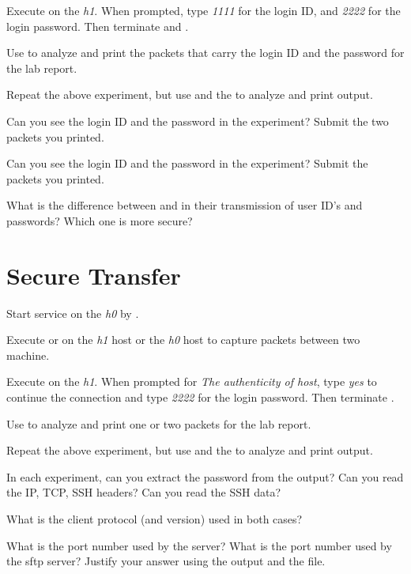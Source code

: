 \documentclass{../UTNetLab}
\begin{document}
Execute  on the \textit{h1}.
When prompted, type \textit{1111} for the login ID, and \textit{2222} for the login password.
Then terminate  and .

Use  to analyze and print the packets that carry the login ID and the password for the lab report.

Repeat the above experiment, but use  and the  to analyze and print output.

\begin{report}
    \item Can you see the login ID and the password in the  experiment? Submit the two packets you printed.

    \item Can you see the login ID and the password in the  experiment? Submit the packets you printed.

    \item What is the difference between  and  in their transmission of user ID’s and passwords? Which one is more secure?
\end{report}

\section{Secure Transfer}
Start  service on the \textit{h0} by .

Execute  or  on the \textit{h1} host or the \textit{h0} host to capture packets between two machine.

Execute  on the \textit{h1}.
When prompted for \textit{The authenticity of host}, type \textit{yes} to continue the connection and type \textit{2222} for the login password.
Then terminate .

Use  to analyze and print one or two  packets for the lab report.

Repeat the above experiment, but use  and the  to analyze and print output.

\begin{report}
    \item In each experiment, can you extract the password from the  output?
    Can you read the IP, TCP, SSH headers?
    Can you read the SSH data?

    \item What is the client protocol (and version) used in both cases?

    \item What is the port number used by the  server?
    What is the port number used by the sftp server?
    Justify your answer using the  output and the  file.
\end{report}
\end{document}
